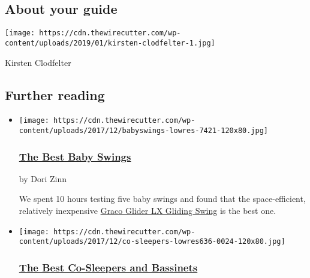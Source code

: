 \hypertarget{about-your-guide}{%
\subsection{About your guide}\label{about-your-guide}}

\texttt{[image: https://cdn.thewirecutter.com/wp-content/uploads/2019/01/kirsten-clodfelter-1.jpg]}

Kirsten Clodfelter

\hypertarget{further-reading}{%
\subsection{Further reading}\label{further-reading}}

\begin{itemize}
\item
  \href{https://www.nytimes3xbfgragh.onion/wirecutter/reviews/best-baby-swings/}{}

  \texttt{[image: https://cdn.thewirecutter.com/wp-content/uploads/2017/12/babyswings-lowres-7421-120x80.jpg]}

  \hypertarget{the-best-baby-swings}{%
  \subsubsection{\texorpdfstring{\href{https://www.nytimes3xbfgragh.onion/wirecutter/reviews/best-baby-swings/}{The
  Best Baby Swings}}{The Best Baby Swings}}\label{the-best-baby-swings}}

  by Dori Zinn

  We spent 10 hours testing five baby swings and found that the
  space-efficient, relatively inexpensive
  \href{https://www.nytimes3xbfgragh.onion/wirecutter/out/link/23874/161464/4/68928/?merchant=BuyBuy\%20Baby}{Graco
  Glider LX Gliding Swing} is the best one.
\item
  \href{https://www.nytimes3xbfgragh.onion/wirecutter/reviews/best-co-sleepers/}{}

  \texttt{[image: https://cdn.thewirecutter.com/wp-content/uploads/2017/12/co-sleepers-lowres636-0024-120x80.jpg]}

  \hypertarget{the-best-co-sleepers-and-bassinets}{%
  \subsubsection{\texorpdfstring{\href{https://www.nytimes3xbfgragh.onion/wirecutter/reviews/best-co-sleepers/}{The
  Best Co-Sleepers and
  Bassinets}}{The Best Co-Sleepers and Bassinets}}\label{the-best-co-sleepers-and-bassinets}}


\end{itemize}
